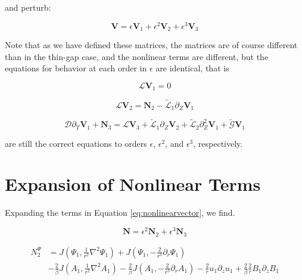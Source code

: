\documentclass{paper}
\newcommand{\beq}{\begin{equation}}
\newcommand{\eeq}{\end{equation}}
\begin{document}
and perturb:

\beq
\mathbf{V} = \epsilon\mathbf{V}_1 + \epsilon^2 \mathbf{V}_2 + \epsilon^3 \mathbf{V}_3
\eeq

Note that as we have defined these matrices, the matrices are of course different than in the thin-gap case, and the nonlinear terms are different, but the equations for behavior at each order in $\epsilon$ are identical, that is

\beq
\mathcal{L} \mathbf{V}_1 = 0
\eeq

\beq
\mathcal{L} \mathbf{V}_2 = \mathbf{N}_2 - \mathcal{\widetilde{L}}_1 \partial_Z \mathbf{V}_1
\eeq

\beq
\mathcal{D}\partial_T\mathbf{V}_1 + \mathbf{N}_3 = \mathcal{L}\mathbf{V}_3 + \mathcal{\widetilde{L}}_1 \partial_Z \mathbf{V}_2 + \mathcal{\widetilde{L}}_2\partial_Z^2 \mathbf{V}_1 + \mathcal{\widetilde{G}}\mathbf{V}_1
\eeq

are still the correct equations to orders $\epsilon$, $\epsilon^2$, and $\epsilon^3$, respectively.


\section{Expansion of Nonlinear Terms}

Expanding the terms in Equation \ref{eq:nonlinearvector}, we find.

\beq
\mathbf{N} = \epsilon^2 \mathbf{N}_2 + \epsilon^3 \mathbf{N}_3
\eeq

\beq
\begin{split}
N_2^{\Psi} & = J\left(\Psi_1, \frac{1}{r^2} \nabla^2 \Psi_1\right) + J\left(\Psi_1, -\frac{2}{r^3}\partial_r\Psi_1\right) \\
&- \frac{2}{\beta} J \left(A_1, \frac{1}{r^2} \nabla^2 A_1\right) - \frac{2}{\beta} J\left(A_1, -\frac{2}{r^3} \partial_r A_1\right) - \frac{2}{r} u_1 \partial_z u_1 + \frac{2}{\beta} \frac{2}{r} B_1 \partial_z B_1
\end{split}
\eeq
\end{document}
